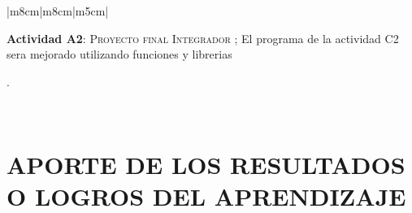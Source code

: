 \documentclass[a4pa<per,12pt,spanish]{article}
\begin{document}
\begin{tabular}[H]{|m{8cm}|m{8cm}|m{5cm}|}
\begin{minipage}[H]{1.0\linewidth}
    
   \colorbox{red!50}{\parbox[t]{2in}{ \textbf{Actividad A2}: \textsc{Proyecto final Integrador }; El programa de la actividad C2 sera mejorado utilizando funciones y librerias}}. 
    \vspace{2cm}
    \vspace{0.2cm}
  \end{minipage}


  \\ \hline

\end{tabular}


\newpage

\section{APORTE DE LOS RESULTADOS O LOGROS DEL APRENDIZAJE}
\label{sec:aporte-de-los}
\end{document}
